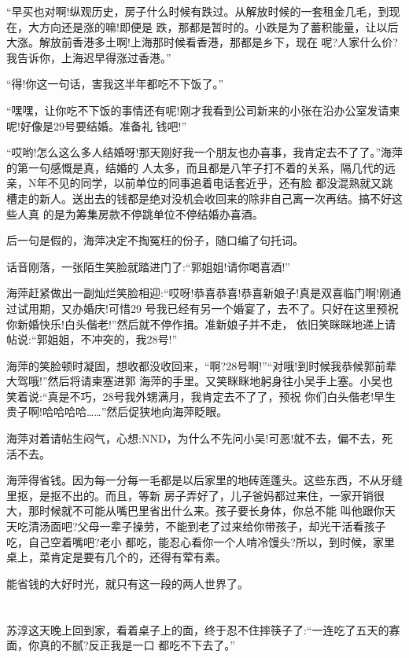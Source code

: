 \documentclass[11pt,a4paper,onecolumn]{article}
\begin{document}
``早买也对啊!纵观历史，房子什么时候有跌过。从解放时候的一套租金几毛，到现在，大方向还是涨的嘛!即便是
跌，那都是暂时的。小跌是为了蓄积能量，让以后大涨。解放前香港多土啊!上海那时候看香港，那都是乡下，现在
呢?人家什么价?我告诉你，上海迟早得涨过香港。''

``得!你这一句话，害我这半年都吃不下饭了。''

``嘿嘿，让你吃不下饭的事情还有呢!刚才我看到公司新来的小张在沿办公室发请柬呢!好像是29号要结婚。准备礼
钱吧!''

``哎哟!怎么这么多人结婚呀!那天刚好我一个朋友也办喜事，我肯定去不了了。''海萍的第一句感慨是真，结婚的
人太多，而且都是八竿子打不着的关系，隔几代的远亲，N年不见的同学，以前单位的同事追着电话套近乎，还有脸
都没混熟就又跳槽走的新人。送出去的钱都是绝对没机会收回来的\myrule 除非自己离一次再结。搞不好这些人真
的是为筹集房款不停跳单位不停结婚办喜酒。

后一句是假的，海萍决定不掏冤枉的份子，随口编了句托词。

话音刚落，一张陌生笑脸就踏进门了:``郭姐姐!请你喝喜酒!''

海萍赶紧做出一副灿烂笑脸相迎:``哎呀!恭喜恭喜!恭喜新娘子!真是双喜临门啊!刚通过试用期，又办婚庆!可惜29
号我已经有另一个婚宴了，去不了。只好在这里预祝你新婚快乐!白头偕老!''然后就不停作揖。准新娘子并不走，
依旧笑眯眯地递上请帖说:``郭姐姐，不冲突的，我28号!''

海萍的笑脸顿时凝固，想收都没收回来，``啊?28号啊!''``对哦!到时候我恭候郭前辈大驾哦!''然后将请柬塞进郭
海萍的手里。又笑眯眯地躬身往小吴手上塞。小吴也笑着说:``真是不巧，28号我外甥满月，我肯定去不了了，预祝
你们白头偕老!早生贵子啊!哈哈哈哈……''然后促狭地向海萍眨眼。

海萍对着请帖生闷气，心想:NND，为什么不先问小吴!可恶!就不去，偏不去，死活不去。

海萍得省钱。因为每一分每一毛都是以后家里的地砖莲蓬头。这些东西，不从牙缝里抠，是抠不出的。而且，等新
房子弄好了，儿子爸妈都过来住，一家开销很大，那时候就不可能从嘴巴里省出什么来。孩子要长身体，你总不能
叫他跟你天天吃清汤面吧?父母一辈子操劳，不能到老了过来给你带孩子，却光干活看孩子吃，自己空着嘴吧?老小
都吃，能忍心看你一个人啃冷馒头?所以，到时候，家里桌上，菜肯定是要有几个的，还得有荤有素。

能省钱的大好时光，就只有这一段的两人世界了。

\section[\thesection]{}

苏淳这天晚上回到家，看着桌子上的面，终于忍不住摔筷子了:``一连吃了五天的寡面，你真的不腻?反正我是一口
都吃不下去了。''
\end{document}
